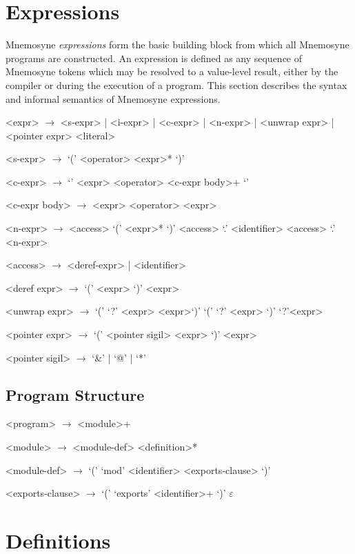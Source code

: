\section{Expressions}\label{sec:expr}

Mnemosyne \textit{expressions} form the basic building block from which all Mnemosyne programs are constructed. An expression is defined as any sequence of Mnemosyne tokens which may be resolved to a value-level result, either by the compiler or during the execution of a program. This section describes the syntax and informal semantics of Mnemosyne expressions.

\begin{grammar}
    <expr> $\to$ <s-expr> | <i-expr> | <c-expr> | <n-expr>
             | <unwrap expr> | <pointer expr>
            \alt <literal>

    <s-expr> $\to$ `(' <operator>  <expr>* `)'

    <c-expr> $\to$ `{' <expr> <operator> <c-expr body>+ `}'

    <c-expr body> $\to$ <expr> <operator>
                   \alt <expr>

    <n-expr> $\to$ <access> `(' <expr>* `)'
              \alt <access> `.' <identifier>
              \alt <access> `.' <n-expr>

    <access> $\to$ <deref-expr> | <identifier>

    <deref expr> $\to$ `(' \lit{\$} <expr> `)'
                  \alt \lit{\$} <expr>

    <unwrap expr> $\to$ `(' `?' <expr> <expr>`)'
                   \alt `(' `?' <expr> `)'
                   \alt `?'<expr>

    <pointer expr> $\to$ `(' <pointer sigil> <expr> `)'
                     <expr>

    <pointer sigil> $\to$ `&' | `@' | `*'
\end{grammar}

\subsection{Program Structure}

\begin{grammar}
<program> $\to$ <module>+

<module> $\to$ <module-def> <definition>*

<module-def> $\to$ `(' `mod' <identifier> <exports-clause> `)'

<exports-clause> $\to$ `(' `exports' <identifier>+ `)'
                \alt $\varepsilon$


\end{grammar}

\section{Definitions}\label{sec:def}
